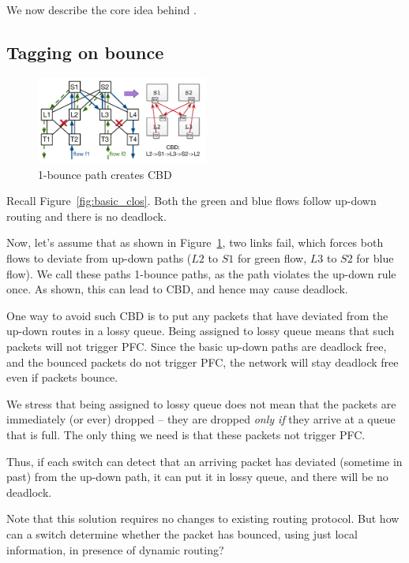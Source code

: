 We now describe the core idea behind \sysname{}.

\subsection{Tagging on bounce}
\label{subsec:tag}

\begin{figure}[t]
	\centering
	\includegraphics[width=0.5\textwidth] {figs/cbd_a}
	\caption{1-bounce path creates CBD}
	\label{fig:clos_1_bounce}
\end{figure}

Recall Figure~\ref{fig:basic_clos}. Both the green and blue flows follow up-down
routing and there is no deadlock. 

Now, let's assume that as shown in Figure~\ref{fig:clos_1_bounce}, two
links fail, which forces both flows to deviate from up-down paths ($L2$ to
$S1$ for green flow, $L3$ to $S2$ for blue flow). We call these paths 1-bounce
paths, as the path violates the up-down rule once. As shown, this can lead to
CBD, and hence may cause deadlock.

One way to avoid such CBD is to put any packets that have deviated from the
up-down routes in a lossy queue.  Being assigned to lossy queue means that such
packets will not trigger PFC. Since the basic up-down paths are deadlock free,
and the bounced packets do not trigger PFC, the network will stay deadlock free
even if packets bounce.

We stress that being assigned to lossy queue does not mean that the packets are
immediately (or ever) dropped -- they are dropped {\em only if} they arrive at a
queue that is full. The only thing we need is that these packets not trigger
PFC.

Thus, if each switch can detect that an arriving packet has deviated (sometime
in past) from the up-down path, it can put it in lossy queue, and there will be
no deadlock.

Note that this solution requires no changes to existing routing protocol.  But
how can a switch determine whether the packet has bounced, using just local
information, in presence of dynamic routing?


